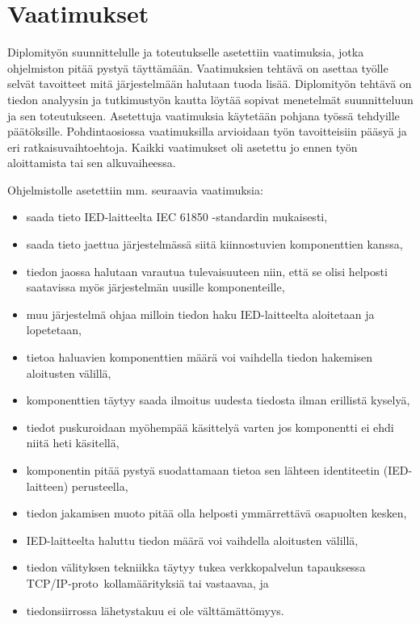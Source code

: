 \section{Vaatimukset}
\label{ch:vaatimukset}
Diplomityön suunnittelulle ja toteutukselle asetettiin vaatimuksia, jotka ohjelmiston pitää pystyä täyttämään. Vaatimuksien tehtävä on asettaa työlle selvät tavoitteet mitä järjestelmään halutaan tuoda lisää. Diplomityön tehtävä on tiedon analyysin ja tutkimustyön kautta löytää sopivat menetelmät suunnitteluun ja sen toteutukseen. Asetettuja vaatimuksia käytetään pohjana työssä tehdyille päätöksille. Pohdintaosiossa vaatimuksilla arvioidaan työn tavoitteisiin pääsyä ja eri ratkaisuvaihtoehtoja. Kaikki vaatimukset oli asetettu jo ennen työn aloittamista tai sen alkuvaiheessa.

Ohjelmistolle asetettiin mm. seuraavia vaatimuksia:
\begin{itemize}
	\item saada tieto IED-laitteelta IEC 61850 -standardin mukaisesti,
	\item saada tieto jaettua järjestelmässä siitä kiinnostuvien komponenttien kanssa,
	\item tiedon jaossa halutaan varautua tulevaisuuteen niin, että se olisi helposti saatavissa myös järjestelmän uusille komponenteille,
	\item muu järjestelmä ohjaa milloin tiedon haku IED-laitteelta aloitetaan ja lopetetaan,
	\item tietoa haluavien komponenttien määrä voi vaihdella tiedon hakemisen aloitusten välillä,	
	\item komponenttien täytyy saada ilmoitus uudesta tiedosta ilman erillistä kyselyä,
	\item tiedot puskuroidaan myöhempää käsittelyä varten jos komponentti ei ehdi niitä heti käsitellä,
	\item komponentin pitää pystyä suodattamaan tietoa sen lähteen identiteetin (IED-laitteen) perusteella,
	\item tiedon jakamisen muoto pitää olla helposti ymmärrettävä osapuolten kesken,
	\item IED-laitteelta haluttu tiedon määrä voi vaihdella aloitusten välillä,
	\item tiedon välityksen tekniikka täytyy tukea verkkopalvelun tapauksessa TCP/IP-pro\-to \-kol\-la\-mää\-ri\-tyk\-si\-ä tai vastaavaa, ja
	\item tiedonsiirrossa lähetystakuu ei ole välttämättömyys.
\end{itemize}

